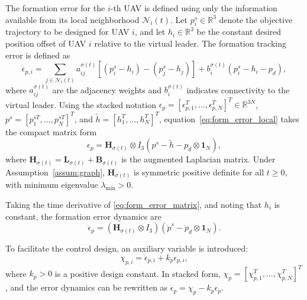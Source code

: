 The formation error for the $i$-th UAV is defined using only the information
available from its local neighborhood $\mathcal{N}_i(t)$. Let $p_i^s \in
\mathbb{R}^3$ denote the objective trajectory to be designed for UAV $i$, and
let $h_i \in \mathbb{R}^3$ be the constant desired position offset of UAV $i$
relative to the virtual leader. The formation tracking error is defined as
\begin{equation}
    \epsilon_{p,i} = \sum_{j \in \mathcal{N}_i(t)} a_{ij}^{\sigma(t)}
    \left[(p_i^s - h_i) - (p_j^s - h_j)\right]
    + b_i^{\sigma(t)}(p_i^s - h_i - p_d),
    \label{eq:form_error_local}
\end{equation}
where $a_{ij}^{\sigma(t)}$ are the adjacency weights and $b_i^{\sigma(t)}$
indicates connectivity to the virtual leader. Using the stacked notation
$\epsilon_p = [\epsilon_{p,1}^T, \ldots, \epsilon_{p,N}^T]^T \in \mathbb{R}^{3N}$,
$p^s = [p_1^{sT}, \ldots, p_N^{sT}]^T$, and $\tilde{h} = [h_1^T, \ldots,
h_N^T]^T$, equation~\eqref{eq:form_error_local} takes the compact matrix form
\begin{equation}
    \epsilon_p = \mathbf{H}_{\sigma(t)} \otimes I_3
    \left(p^s - \tilde{h} - p_d \otimes \mathbf{1}_N\right),
    \label{eq:form_error_matrix}
\end{equation}
where $\mathbf{H}_{\sigma(t)} = \mathbf{L}_{\sigma(t)} + \mathbf{B}_{\sigma(t)}$
is the augmented Laplacian matrix. Under Assumption~\ref{assum:graph},
$\mathbf{H}_{\sigma(t)}$ is symmetric positive definite for all $t \geq 0$, with
minimum eigenvalue $\lambda_{\min} > 0$.

Taking the time derivative of \eqref{eq:form_error_matrix}, and noting that
$h_i$ is constant, the formation error dynamics are
\begin{equation}
    \dot{\epsilon}_p = \left(\mathbf{H}_{\sigma(t)} \otimes I_3\right)
    \left(\dot{p}^s - \dot{p}_d \otimes \mathbf{1}_N\right).
    \label{eq:form_error_dyn}
\end{equation}

To facilitate the control design, an auxiliary variable is introduced:
\begin{equation}
    \chi_{p,i} = \dot{\epsilon}_{p,i} + k_p \epsilon_{p,i},
    \label{eq:chi_def}
\end{equation}
where $k_p > 0$ is a positive design constant. In stacked form,
$\chi_p = [\chi_{p,1}^T, \ldots, \chi_{p,N}^T]^T$, and the error dynamics
can be rewritten as $\dot{\epsilon}_p = \chi_p - k_p \epsilon_p$.

